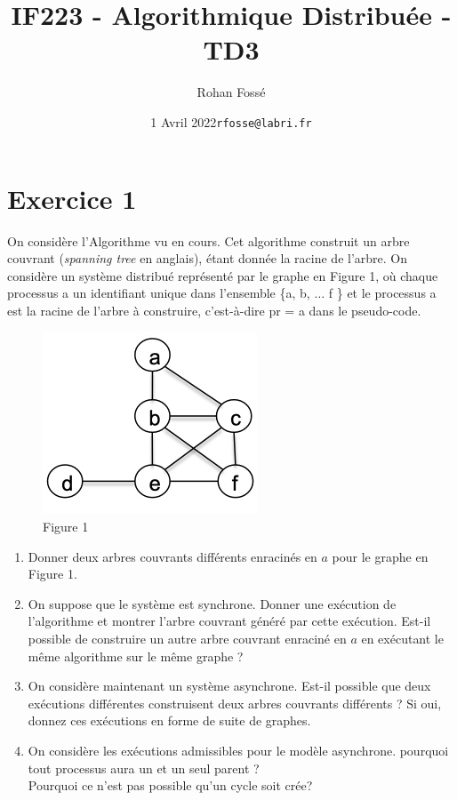 \documentclass[10pt,a4paper]{article}
\title{IF223 - Algorithmique Distribuée - TD3}
\date{1 Avril 2022}
\author{Rohan Fossé}
\date{\texttt{rfosse@labri.fr}}
\begin{document}
\maketitle


\section*{Exercice 1}

On considère l’Algorithme vu en cours. Cet algorithme construit un arbre couvrant (\textit{spanning tree} en anglais), étant donnée la racine de l’arbre. On considère un système distribué représenté par le graphe en Figure 1, où chaque processus a un identifiant unique dans l’ensemble \{a, b, $\ldots$ f \} et le processus a est la racine de l’arbre à construire, c’est-à-dire pr = a dans le pseudo-code.

\begin{figure}[h!]
    \centering
    \includegraphics[scale=0.6]{fig1.png}
    \caption{Figure 1}
    \label{fig:fig1}
\end{figure}

\begin{enumerate}
    \item Donner deux arbres couvrants différents enracinés en $a$ pour le graphe en Figure 1.
    \item On suppose que le système est synchrone. Donner une exécution de l'algorithme et montrer l'arbre couvrant généré par cette exécution. Est-il possible de construire un autre arbre couvrant enraciné en $a$ en exécutant le même algorithme sur le même graphe ?
    \item On considère maintenant un système asynchrone. Est-il possible que deux exécutions différentes construisent deux arbres couvrants différents ? Si oui, donnez ces exécutions en forme de suite de graphes.
    \item On considère les exécutions admissibles pour le modèle asynchrone. pourquoi tout processus aura un et un seul parent ?\\
    Pourquoi ce n'est pas possible qu'un cycle soit crée?
\end{enumerate}
\end{document}
